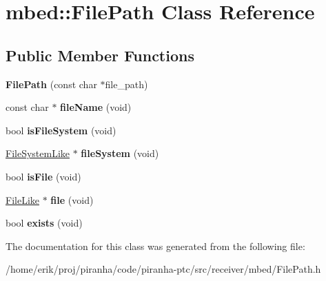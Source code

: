\hypertarget{classmbed_1_1FilePath}{}\section{mbed\+:\+:File\+Path Class Reference}
\label{classmbed_1_1FilePath}
\subsection*{Public Member Functions}
\begin{DoxyCompactItemize}
\item 
{\bfseries File\+Path} (const char $\ast$file\+\_\+path)\hypertarget{classmbed_1_1FilePath_a8ab3386715d0bba08598ff7d6d808b2f}{}\label{classmbed_1_1FilePath_a8ab3386715d0bba08598ff7d6d808b2f}

\item 
const char $\ast$ {\bfseries file\+Name} (void)\hypertarget{classmbed_1_1FilePath_a7c6024cd8c7b93ce267b3bfa20165a47}{}\label{classmbed_1_1FilePath_a7c6024cd8c7b93ce267b3bfa20165a47}

\item 
bool {\bfseries is\+File\+System} (void)\hypertarget{classmbed_1_1FilePath_af5b6f97de6af234024168f33e6f9b37a}{}\label{classmbed_1_1FilePath_af5b6f97de6af234024168f33e6f9b37a}

\item 
\hyperlink{classmbed_1_1FileSystemLike}{File\+System\+Like} $\ast$ {\bfseries file\+System} (void)\hypertarget{classmbed_1_1FilePath_ab905306788354319208e23cbda225ed0}{}\label{classmbed_1_1FilePath_ab905306788354319208e23cbda225ed0}

\item 
bool {\bfseries is\+File} (void)\hypertarget{classmbed_1_1FilePath_ac6a8b31743394dfc69b17797cbf8d5cf}{}\label{classmbed_1_1FilePath_ac6a8b31743394dfc69b17797cbf8d5cf}

\item 
\hyperlink{classmbed_1_1FileLike}{File\+Like} $\ast$ {\bfseries file} (void)\hypertarget{classmbed_1_1FilePath_a978e3d43e0432cdaf7326b4c078203b0}{}\label{classmbed_1_1FilePath_a978e3d43e0432cdaf7326b4c078203b0}

\item 
bool {\bfseries exists} (void)\hypertarget{classmbed_1_1FilePath_a639f23eef059adca9af13ce3ba180e60}{}\label{classmbed_1_1FilePath_a639f23eef059adca9af13ce3ba180e60}

\end{DoxyCompactItemize}


The documentation for this class was generated from the following file\+:\begin{DoxyCompactItemize}
\item 
/home/erik/proj/piranha/code/piranha-\/ptc/src/receiver/mbed/File\+Path.\+h\end{DoxyCompactItemize}

